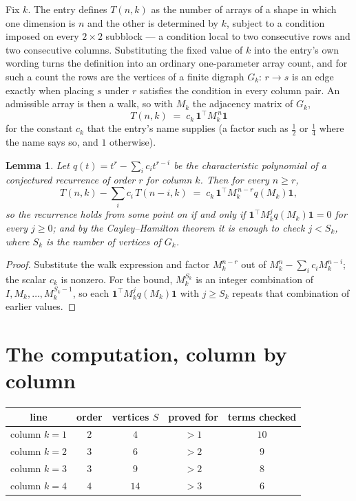 \documentclass[11pt,a4paper]{article}
\theoremstyle{plain}
\newtheorem{lemma}[theorem]{Lemma}
\theoremstyle{definition}
\begin{document}
Fix $k$. The entry defines $T(n,k)$ as the number of arrays of a shape in which one dimension
is $n$ and the other is determined by $k$, subject to a condition imposed on every
$2\times2$ subblock --- a condition local to two consecutive rows and two consecutive columns.
Substituting the fixed value of $k$ into the entry's own wording turns the definition into an
ordinary one-parameter array count, and for such a count the rows are the vertices of a finite
digraph $G_k$: $r\to s$ is an edge exactly when placing $s$ under $r$ satisfies the condition
in every column pair. An admissible array is then a walk, so with $M_k$ the adjacency matrix
of $G_k$,
\[
T(n,k)\;=\;c_k\,\mathbf{1}^{\!\top}M_k^{\,n}\mathbf{1}
\]
for the constant $c_k$ that the entry's name supplies (a factor such as $\tfrac12$ or
$\tfrac14$ where the name says so, and $1$ otherwise).

\begin{lemma}\label{lem:crit}
Let $q(t)=t^{r}-\sum_i c_it^{r-i}$ be the characteristic polynomial of a conjectured
recurrence of order $r$ for column $k$. Then for every $n\ge r$,
\[
T(n,k)-\sum_i c_i\,T(n-i,k)\;=\;c_k\,\mathbf{1}^{\!\top}M_k^{\,n-r}q(M_k)\mathbf{1},
\]
so the recurrence holds from some point on if and only if
$\mathbf{1}^{\!\top}M_k^{j}q(M_k)\mathbf{1}=0$ for every $j\ge0$; and by the
Cayley--Hamilton theorem it is enough to check $j<S_k$, where $S_k$ is the number of vertices
of $G_k$.
\end{lemma}

\begin{proof}
Substitute the walk expression and factor $M_k^{n-r}$ out of $M_k^{n}-\sum_ic_iM_k^{n-i}$;
the scalar $c_k$ is nonzero. For the bound, $M_k^{S_k}$ is an integer combination of
$I,M_k,\dots,M_k^{S_k-1}$, so each $\mathbf{1}^{\!\top}M_k^{j}q(M_k)\mathbf{1}$ with
$j\ge S_k$ repeats that combination of earlier values.
\end{proof}

\section{The computation, column by column}

\begin{center}
\begin{tabular}{ccccc}
line & order & vertices $S$ & proved for & terms checked \\ \hline
column $k$$=1$ & $2$ & $4$ & $>1$ & $10$ \\
column $k$$=2$ & $3$ & $6$ & $>2$ & $9$ \\
column $k$$=3$ & $3$ & $9$ & $>2$ & $8$ \\
column $k$$=4$ & $4$ & $14$ & $>3$ & $6$ \\
\end{tabular}
\end{center}
\end{document}
